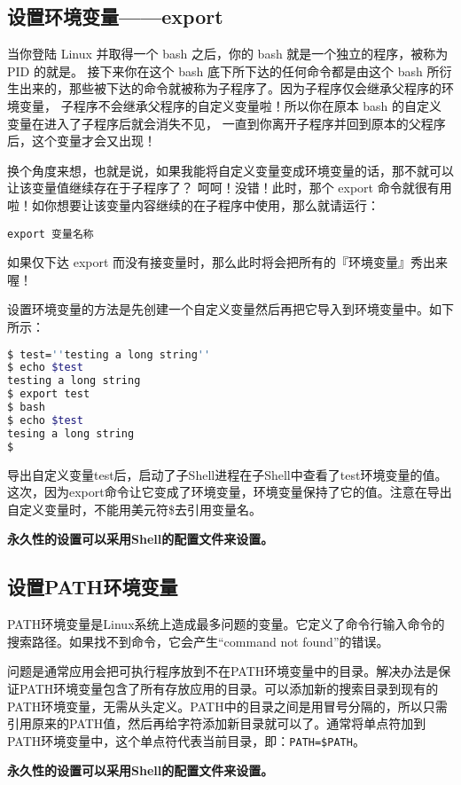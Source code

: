 \subsection{设置环境变量——export}
当你登陆 Linux 并取得一个 bash 之后，你的 bash 就是一个独立的程序，被称为 PID 的就是。 接下来你在这个 bash 底下所下达的任何命令都是由这个 bash 所衍生出来的，那些被下达的命令就被称为子程序了。因为子程序仅会继承父程序的环境变量， 子程序不会继承父程序的自定义变量啦！所以你在原本 bash 的自定义变量在进入了子程序后就会消失不见， 一直到你离开子程序并回到原本的父程序后，这个变量才会又出现！

换个角度来想，也就是说，如果我能将自定义变量变成环境变量的话，那不就可以让该变量值继续存在于子程序了？ 呵呵！没错！此时，那个 export 命令就很有用啦！如你想要让该变量内容继续的在子程序中使用，那么就请运行：

\verb|export 变量名称|

 如果仅下达 export 而没有接变量时，那么此时将会把所有的『环境变量』秀出来喔！

设置环境变量的方法是先创建一个自定义变量然后再把它导入到环境变量中。如下所示：
\begin{lstlisting}[language=sh]
$ test=''testing a long string''
$ echo $test
testing a long string
$ export test
$ bash
$ echo $test
tesing a long string
$
\end{lstlisting}

导出自定义变量test后，启动了子Shell进程在子Shell中查看了test环境变量的值。这次，因为export命令让它变成了环境变量，环境变量保持了它的值。注意在导出自定义变量时，不能用美元符\$去引用变量名。

\textbf{永久性的设置可以采用Shell的配置文件来设置。}




\subsection{设置PATH环境变量}
PATH环境变量是Linux系统上造成最多问题的变量。它定义了命令行输入命令的搜索路径。如果找不到命令，它会产生“command not found”的错误。

问题是通常应用会把可执行程序放到不在PATH环境变量中的目录。解决办法是保证PATH环境变量包含了所有存放应用的目录。可以添加新的搜索目录到现有的PATH环境变量，无需从头定义。PATH中的目录之间是用冒号分隔的，所以只需引用原来的PATH值，然后再给字符添加新目录就可以了。通常将单点符加到PATH环境变量中，这个单点符代表当前目录，即：\verb|PATH=$PATH|。

\textbf{永久性的设置可以采用Shell的配置文件来设置。}



